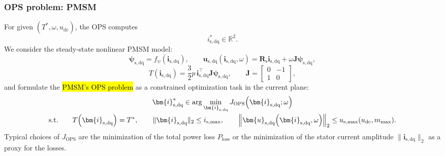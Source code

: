 \begin{frame}
    \frametitle{OPS problem: PMSM}
    For given $(T^*,\omega,u_{\mathrm{dc}})$, the OPS computes
    \[
        i_{\mathrm{s,dq}}^* \in \mathbb{R}^2 .
    \]\pause%
    We consider the steady-state nonlinear PMSM model:
    \begin{equation*}
        \bm{\psi}_{\mathrm{s,dq}} = f_{\psi}\!\left(\bm{i}_{\mathrm{s,dq}}\right),
        \qquad
        \bm{u}_{\mathrm{s,dq}}\!\left(\bm{i}_{\mathrm{s,dq}},\omega\right)
        =
        \bm{R}_{\mathrm{s}}\bm{i}_{\mathrm{s,dq}}
        +
        \omega \bm{J} \bm{\psi}_{\mathrm{s,dq}},
        \label{eq:ops_pmsm_model}
    \end{equation*}
    \begin{equation*}
        T\!\left(\bm{i}_{\mathrm{s,dq}}\right)
        =
        \frac{3}{2}p\,
        \bm{i}_{\mathrm{s,dq}}^\top \bm{J} \bm{\psi}_{\mathrm{s,dq}},
        \qquad
        \bm{J}=
        \begin{bmatrix}
            0 & -1 \\
            1 & 0
        \end{bmatrix},
        \label{eq:ops_pmsm_torque}
    \end{equation*}\pause%
    and formulate the \hl{PMSM's OPS problem} as a constrained optimization task in the current plane:
    \begin{gather}
        \bm{i}_{\mathrm{s,dq}}^*
        \in
        \arg\min_{\bm{i}_{\mathrm{s,dq}}}
        J_{\mathrm{OPS}}\!\left(\bm{i}_{\mathrm{s,dq}};\omega\right)
        \\[-0.5mm]
        \text{s.t.}\qquad
        T\!\left(\bm{i}_{\mathrm{s,dq}}\right)=T^*,
        \qquad
        \|\bm{i}_{\mathrm{s,dq}}\|_2\le i_{\mathrm{s},\max}, \qquad  \left\|
        \bm{u}_{\mathrm{s,dq}}\!\left(\bm{i}_{\mathrm{s,dq}},\omega\right)
        \right\|_2\le
        u_{\mathrm{s},\max}(u_{\mathrm{dc}},m_{\max}) . \notag
        \label{eq:ops_pmsm_problem}
    \end{gather}\pause%
    Typical choices of $J_{\mathrm{OPS}}$ are the minimization of the total power loss $P_{\mathrm{loss}}$ or the minimization of the stator current amplitude $\|\bm{i}_{\mathrm{s,dq}}\|_2$ as a proxy for the losses.
\end{frame}

